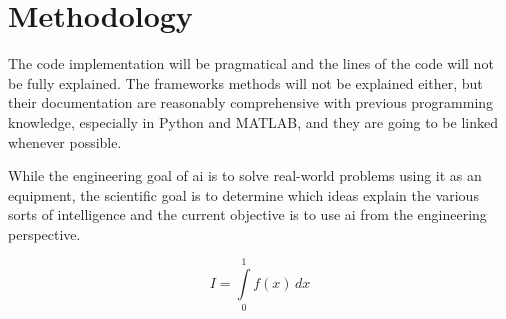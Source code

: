 \chapter{Methodology}\label{sec:methodology}

The code implementation will be pragmatical and the lines of the code will not be fully explained. The frameworks methods will not be explained either, but their documentation are reasonably comprehensive with previous programming knowledge, especially in Python and MATLAB, and they are going to be linked whenever possible.

While the engineering goal of \gls*{ai} is to solve real-world problems using it as an equipment, the scientific goal is to determine which ideas explain the various sorts of intelligence \cite{winston1992} and the current objective is to use \gls*{ai} from the engineering perspective.

\begin{equation}
    I = \int\limits_0^1 f(x)\,dx
\end{equation}